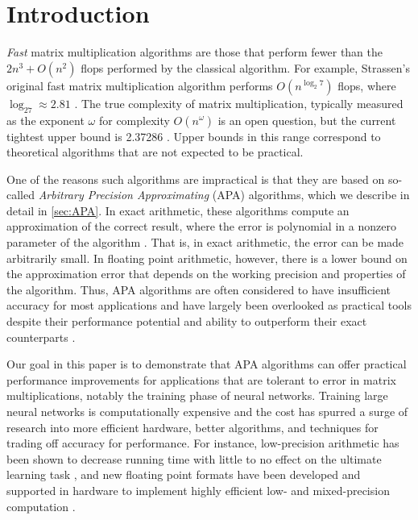 \documentclass[conference]{IEEEtran}
\begin{document}
\section{Introduction}

\emph{Fast} matrix multiplication algorithms are those that perform fewer than the $2n^3+O(n^2)$ flops performed by the classical algorithm.
For example, Strassen's original fast matrix multiplication algorithm performs $O(n^{\log_2 7})$ flops, where $\log_27 \approx 2.81$ \cite{Strassen69}.
The true complexity of matrix multiplication, typically measured as the exponent $\omega$ for complexity $O(n^\omega)$ is an open question, but the current tightest upper bound is 2.37286 \cite{AW21}.
Upper bounds in this range correspond to theoretical algorithms that are not expected to be practical.

One of the reasons such algorithms are impractical is that they are based on so-called \emph{Arbitrary Precision Approximating} (APA) algorithms, which we describe in detail in \cref{sec:APA}.
In exact arithmetic, these algorithms compute an approximation of the correct result, where the error is polynomial in a nonzero parameter of the algorithm \cite{BLR80}.
That is, in exact arithmetic, the error can be made arbitrarily small.
In floating point arithmetic, however, there is a lower bound on the approximation error that depends on the working precision and properties of the algorithm.
Thus, APA algorithms are often considered to have insufficient accuracy for most applications and have largely been overlooked as practical tools despite their performance potential and ability to outperform their exact counterparts \cite{BB15}.

Our goal in this paper is to demonstrate that APA algorithms can offer practical performance improvements for applications that are tolerant to error in matrix multiplications, notably the training phase of neural networks.
Training large neural networks is computationally expensive and the cost has spurred a surge of research into more efficient hardware, better algorithms, and techniques for trading off accuracy for performance.
For instance, low-precision arithmetic has been shown to decrease running time with little to no effect on the ultimate learning task \cite{GAGN15,HCSEB17}, and new floating point formats have been developed and supported in hardware to implement highly efficient low- and mixed-precision computation \cite{KM+19,YWC20}.
\end{document}

